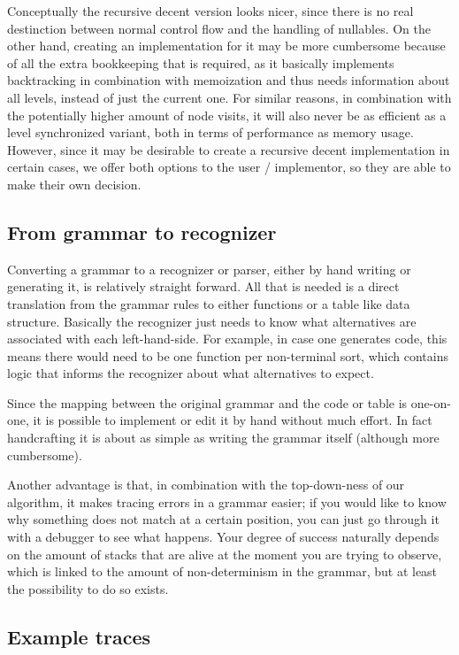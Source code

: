 \documentclass[a4paper,10pt]{article}
\begin{document}
Conceptually the recursive decent version looks nicer, since there is no real destinction between normal control flow and the handling of nullables. On the other hand, creating an implementation for it may be more cumbersome because of all the extra bookkeeping that is required, as it basically implements backtracking in combination with memoization and thus needs information about all levels, instead of just the current one. For similar reasons, in combination with the potentially higher amount of node visits, it will also never be as efficient as a level synchronized variant, both in terms of performance as memory usage. However, since it may be desirable to create a recursive decent implementation in certain cases, we offer both options to the user / implementor, so they are able to make their own decision.

\subsection{From grammar to recognizer}

Converting a grammar to a recognizer or parser, either by hand writing or generating it, is relatively straight forward. All that is needed is a direct translation from the grammar rules to either functions or a table like data structure. Basically the recognizer just needs to know what alternatives are associated with each left-hand-side. For example, in case one generates code, this means there would need to be one function per non-terminal sort, which contains logic that informs the recognizer about what alternatives to expect.

Since the mapping between the original grammar and the code or table is one-on-one, it is possible to implement or edit it by hand without much effort. In fact handcrafting it is about as simple as writing the grammar itself (although more cumbersome).

Another advantage is that, in combination with the top-down-ness of our algorithm, it makes tracing errors in a grammar easier; if you would like to know why something does not match at a certain position, you can just go through it with a debugger to see what happens. Your degree of success naturally depends on the amount of stacks that are alive at the moment you are trying to observe, which is linked to the amount of non-determinism in the grammar, but at least the possibility to do so exists.

\subsection{Example traces}
\end{document}
